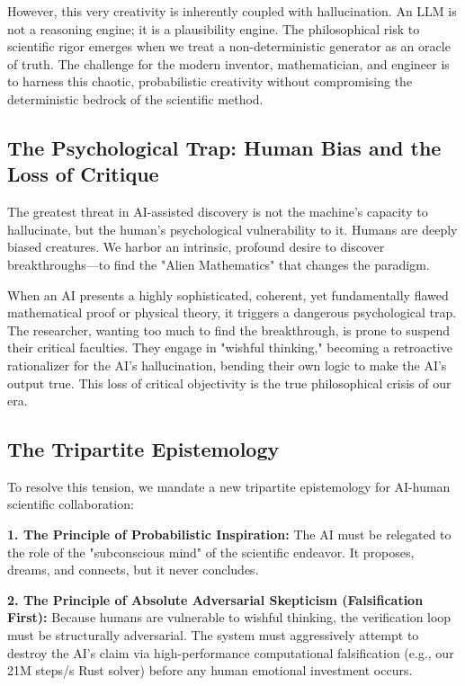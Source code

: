 \documentclass[11pt,a4paper]{article}
\begin{document}
However, this very creativity is inherently coupled with hallucination. An LLM is not a reasoning engine; it is a plausibility engine. The philosophical risk to scientific rigor emerges when we treat a non-deterministic generator as an oracle of truth. The challenge for the modern inventor, mathematician, and engineer is to harness this chaotic, probabilistic creativity without compromising the deterministic bedrock of the scientific method.

\subsection{The Psychological Trap: Human Bias and the Loss of Critique}
The greatest threat in AI-assisted discovery is not the machine's capacity to hallucinate, but the human's psychological vulnerability to it. Humans are deeply biased creatures. We harbor an intrinsic, profound desire to discover breakthroughs—to find the "Alien Mathematics" that changes the paradigm. 

When an AI presents a highly sophisticated, coherent, yet fundamentally flawed mathematical proof or physical theory, it triggers a dangerous psychological trap. The researcher, wanting too much to find the breakthrough, is prone to suspend their critical faculties. They engage in "wishful thinking," becoming a retroactive rationalizer for the AI's hallucination, bending their own logic to make the AI's output true. This loss of critical objectivity is the true philosophical crisis of our era.

\subsection{The Tripartite Epistemology}
To resolve this tension, we mandate a new tripartite epistemology for AI-human scientific collaboration:

\textbf{1. The Principle of Probabilistic Inspiration:} The AI must be relegated to the role of the "subconscious mind" of the scientific endeavor. It proposes, dreams, and connects, but it never concludes.

\textbf{2. The Principle of Absolute Adversarial Skepticism (Falsification First):} Because humans are vulnerable to wishful thinking, the verification loop must be structurally adversarial. The system must aggressively attempt to destroy the AI's claim via high-performance computational falsification (e.g., our 21M steps/s Rust solver) before any human emotional investment occurs.
\end{document}
